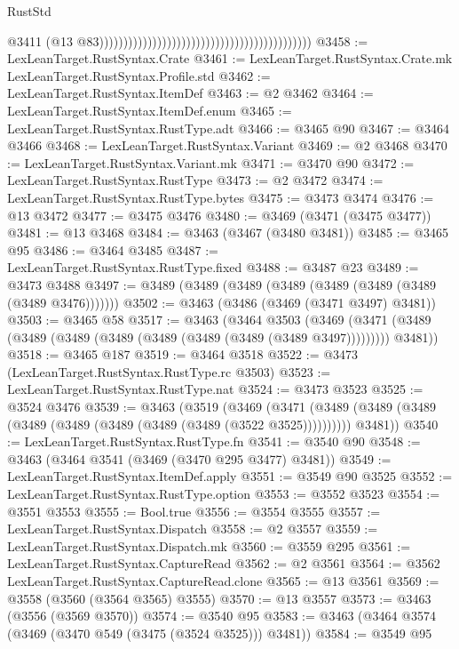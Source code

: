 \begin{lexlean}{RustStd}
\begin{coremodule}
{\begin{coremodule}
{{{{{{{{{{{{{{{{{{{{{{{{{{{{{{{{{{{{{{{{{{{{{{{                                                                                          @3411
                                                                                          (@13
                                                                                            @83))))))))))))))))))))))))))))))))))))))))))))
@3458 := LexLeanTarget.RustSyntax.Crate
@3461 := LexLeanTarget.RustSyntax.Crate.mk LexLeanTarget.RustSyntax.Profile.std
@3462 := LexLeanTarget.RustSyntax.ItemDef
@3463 := @2 @3462
@3464 := LexLeanTarget.RustSyntax.ItemDef.enum
@3465 := LexLeanTarget.RustSyntax.RustType.adt
@3466 := @3465 @90
@3467 := @3464 @3466
@3468 := LexLeanTarget.RustSyntax.Variant
@3469 := @2 @3468
@3470 := LexLeanTarget.RustSyntax.Variant.mk
@3471 := @3470 @90
@3472 := LexLeanTarget.RustSyntax.RustType
@3473 := @2 @3472
@3474 := LexLeanTarget.RustSyntax.RustType.bytes
@3475 := @3473 @3474
@3476 := @13 @3472
@3477 := @3475 @3476
@3480 := @3469 (@3471 (@3475 @3477))
@3481 := @13 @3468
@3484 := @3463 (@3467 (@3480 @3481))
@3485 := @3465 @95
@3486 := @3464 @3485
@3487 := LexLeanTarget.RustSyntax.RustType.fixed
@3488 := @3487 @23
@3489 := @3473 @3488
@3497 := @3489 (@3489 (@3489 (@3489 (@3489 (@3489 (@3489 (@3489 @3476)))))))
@3502 := @3463 (@3486 (@3469 (@3471 @3497) @3481))
@3503 := @3465 @58
@3517 := @3463
    (@3464
      @3503
      (@3469 (@3471 (@3489 (@3489 (@3489 (@3489 (@3489 (@3489 (@3489 (@3489 @3497))))))))) @3481))
@3518 := @3465 @187
@3519 := @3464 @3518
@3522 := @3473 (LexLeanTarget.RustSyntax.RustType.rc @3503)
@3523 := LexLeanTarget.RustSyntax.RustType.nat
@3524 := @3473 @3523
@3525 := @3524 @3476
@3539 := @3463
    (@3519
      (@3469
        (@3471 (@3489 (@3489 (@3489 (@3489 (@3489 (@3489 (@3489 (@3489 (@3522 @3525))))))))))
        @3481))
@3540 := LexLeanTarget.RustSyntax.RustType.fn
@3541 := @3540 @90
@3548 := @3463 (@3464 @3541 (@3469 (@3470 @295 @3477) @3481))
@3549 := LexLeanTarget.RustSyntax.ItemDef.apply
@3551 := @3549 @90 @3525
@3552 := LexLeanTarget.RustSyntax.RustType.option
@3553 := @3552 @3523
@3554 := @3551 @3553
@3555 := Bool.true
@3556 := @3554 @3555
@3557 := LexLeanTarget.RustSyntax.Dispatch
@3558 := @2 @3557
@3559 := LexLeanTarget.RustSyntax.Dispatch.mk
@3560 := @3559 @295
@3561 := LexLeanTarget.RustSyntax.CaptureRead
@3562 := @2 @3561
@3564 := @3562 LexLeanTarget.RustSyntax.CaptureRead.clone
@3565 := @13 @3561
@3569 := @3558 (@3560 (@3564 @3565) @3555)
@3570 := @13 @3557
@3573 := @3463 (@3556 (@3569 @3570))
@3574 := @3540 @95
@3583 := @3463 (@3464 @3574 (@3469 (@3470 @549 (@3475 (@3524 @3525))) @3481))
@3584 := @3549 @95
}}}}}}}}}}}}}}}}}}}}}}}}}}}}}}}}}}}}}}}}}}}}}}}
\end{coremodule}}
\end{coremodule}
\end{lexlean}
